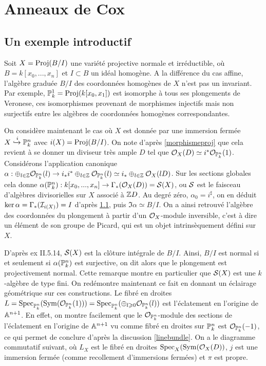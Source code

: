\chapter{Anneaux de Cox}

\section{Un exemple introductif}

Soit $X=\operatorname{Proj}(B/I)$ une variété projective normale et irréductible, où $B=k[x_0,...,x_n]$ et $I\subset B$ un idéal homogène. A la différence du cas affine, l'algèbre graduée $B/I$ des coordonnées homogènes de $X$ n'est pas un invariant. Par exemple, $\mathbb{P}^1_k=\operatorname{Proj}(k[x_0,x_1])$ est isomorphe à tous ses plongements de Veronese, ces isomorphismes provenant de morphismes injectifs mais non surjectifs entre les algèbres de coordonnées homogènes correspondantes.

On considère maintenant le cas où $X$ est donnée par une immersion fermée $X\xhookrightarrow{i}\mathbb{P}^n_k $ avec $i(X)=\operatorname{Proj}(B/I)$. On note d'après \ref{morphismeproj} que cela revient à se donner un diviseur très ample $D$ tel que $\mathcal{O}_X(D)\simeq i^*\mathcal{O}_{\mathbb{P}^n_k}(1)$. Considérons l'application canonique $\alpha: \oplus_{l\in\mathbb{Z}}\mathcal{O}_{\mathbb{P}^n_k}(l)\rightarrow i_*i^*\oplus_{l\in \mathbb{Z}}\mathcal{O}_{\mathbb{P}^n_k}(l)\simeq i_*\oplus_{l\in \mathbb{Z}}\mathcal{O}_X(lD)$. Sur les sections globales cela donne $\alpha(\mathbb{P}^n_k): k[x_0,...,x_n]\rightarrow \Gamma_*(\mathcal{O}_X(D))=\mathcal{S}(X)$, ou $\mathcal{S}$ est le faisceau d'algèbres divisorielles sur $X$ associé à $\mathbb{Z} D$. Au degré zéro, $\alpha_0=i^\sharp$, on en déduit $\ker \alpha=\Gamma_*(\mathcal{I} _{i(X)})=I$ d'après \ref{}, puis $\Im \alpha \simeq B/I$. On a ainsi retrouvé l'algèbre des coordonnées du plongement à partir d'un $\mathcal{O}_X$-module inversible, c'est à dire un élément de son groupe de Picard, qui est un objet intrinsèquement défini sur $X$.

D'après \cite{Hartshorne} ex II.5.14, $\mathcal{S}(X)$ est la clôture intégrale de $B/I$. Ainsi, $B/I$ est normal si et seulement si $\alpha(\mathbb{P}^n_k)$ est surjective, on dit alors que le plongement est projectivement normal. Cette remarque montre en particulier que $\mathcal{S}(X)$ est une $k$-algèbre de type fini. On redémontre maintenant ce fait en donnant un éclairage géométrique sur ces constructions. Le fibré en droites $L=\operatorname{Spec}_{\mathbb{P}^n_k}(\operatorname{Sym}(\mathcal{O}_{\mathbb{P}^n_k}(1))) = \operatorname{Spec}_{\mathbb{P}^n_k}(\oplus_{l\geqslant 0}\mathcal{O}_{\mathbb{P}^n_k}(l))$ est l'éclatement en l'origine de $\mathbb{A}^{n+1}$. En effet, on montre facilement que le $\mathcal{O}_{\mathbb{P}^n_k}$-module des sections de l'éclatement en l'origine de $\mathbb{A}^{n+1}$ vu comme fibré en droites sur $\mathbb{P}_k^n$ est $ \mathcal{O}_{\mathbb{P}^n_k}(-1)$, ce qui permet de conclure d'après la discussion \ref{linebundle}. On a le diagramme commutatif suivant, où $L_X$ est le fibré en droites $\operatorname{Spec}_X(\operatorname{Sym}(\mathcal{O}_X(D))$, $j$ est une immersion fermée (comme recollement d'immersions fermées) et $\pi$ est propre.

